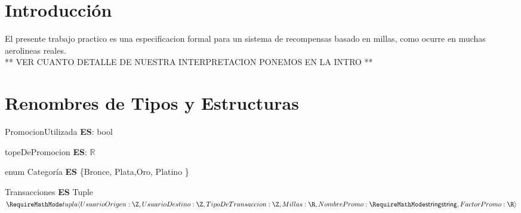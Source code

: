 \documentclass[11pt,a4paper]{article}
\newcommand{\Tipo}[1]{\mathsf{#1}}
\begin{document}
\section{Introducción}

El presente trabajo practico es una especificacion formal para un sistema de recompensas basado en millas, como ocurre en muchas aerolineas reales.
\\
** VER CUANTO DETALLE DE NUESTRA INTERPRETACION PONEMOS EN LA INTRO **

\section{Renombres de Tipos y Estructuras}

\noindent PromocionUtilizada \textbf{ES}: bool

\noindent topeDePromocion \textbf{ES}: $\mathbb{R}$

\noindent enum Categoría \textbf{ES} \{Bronce, Plata,Oro, Platino  \}

\vspace{0.5cm}

\noindent Transacciones \textbf{ES} Tuple $\tupla{
	UsuarioOrigen: \Tipo{\Z}, \\
	UsuarioDestino: \Tipo{\Z},
	TipoDeTransaccion: \Tipo{\Z},
	Millas: \Tipo{\R}, \\
	NombrePromo: \Tipo{\str},
	FactorPromo: \Tipo{\R}
	}$

\noindent {}

\vspace{2em}
\end{document}
